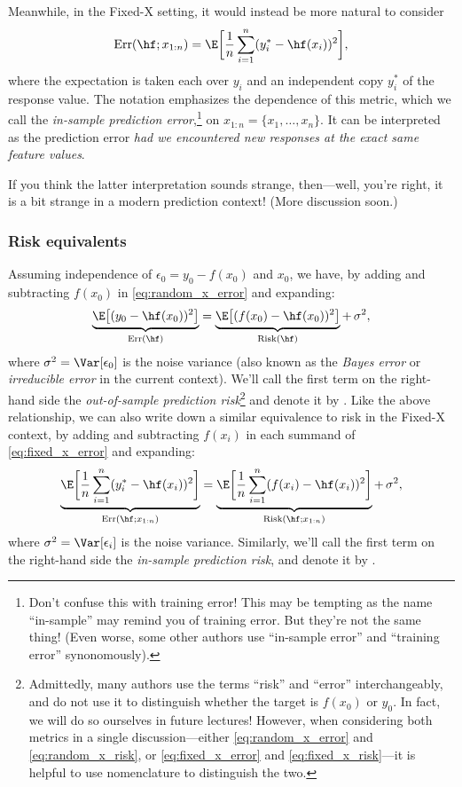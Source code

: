 \documentclass{article}
\begin{document}
Meanwhile, in the Fixed-X setting, it would instead be more natural to consider       
\begin{equation}
\label{eq:fixed_x_error}
\Err(\hf; x_{1:n}) = \E\bigg[ \frac{1}{n}\sum_{i=1}^n (y_i^* - \hf(x_i))^2
\bigg], 
\end{equation}
where the expectation is taken each over $y_i$ and an independent copy $y_i^*$
of the response value. The notation  emphasizes the 
dependence of this metric, which we call the \emph{in-sample prediction
  error},\footnote{Don't confuse this with training error! This may be tempting
  as the name ``in-sample'' may remind you of training error. But they're not
  the same thing! (Even worse, some other authors use ``in-sample error'' and
  ``training error'' synonomously).}     
on $x_{1:n} = \{x_1,\dots,x_n\}$. It can be interpreted as the prediction error
\emph{had we encountered new responses at the exact same feature values}.

If you think the latter interpretation sounds strange, then---well, you're
right, it is a bit strange in a modern prediction context! (More discussion
soon.)    

\subsubsection{Risk equivalents} 

Assuming independence of $\epsilon_0 = y_0 - f(x_0)$ and $x_0$, we have, by
adding and subtracting $f(x_0)$ in \eqref{eq:random_x_error} and expanding:  
\[
\underbrace{\E\big[ (y_0 - \hf(x_0))^2 \big]}_{\Err(\hf)} =
\underbrace{\E\big[ (f(x_0) - \hf(x_0))^2 \big]}_{\Risk(\hf)} +\, \sigma^2,
\]
where $\sigma^2 = \Var[\epsilon_0]$ is the noise variance (also known as the 
\emph{Bayes error} or \emph{irreducible error} in the current context). We'll
call the first term on the right-hand side the \emph{out-of-sample prediction
  risk}\footnote{Admittedly, many authors use the terms ``risk'' and ``error'' 
  interchangeably, and do not use it to distinguish whether the target is
  $f(x_0)$ or $y_0$. In fact, we will do so ourselves in future lectures!
  However, when considering both metrics in a single discussion---either 
  \eqref{eq:random_x_error} and \eqref{eq:random_x_risk}, or 
  \eqref{eq:fixed_x_error} and \eqref{eq:fixed_x_risk}---it is helpful to use  
  nomenclature to distinguish the two.} 
and denote it by \smash{$\Risk(\hf)$}. Like the above relationship, we can also
write down a similar equivalence to risk in the Fixed-X context, by adding and
subtracting $f(x_i)$ in each summand of \eqref{eq:fixed_x_error} and expanding:  
\[
\underbrace{\E\bigg[ \frac{1}{n}\sum_{i=1}^n (y_i^* - \hf(x_i))^2 
  \bigg]}_{\Err(\hf; x_{1:n})} =   
\underbrace{\E\bigg[ \frac{1}{n}\sum_{i=1}^n (f(x_i) - \hf(x_i))^2
  \bigg]}_{\Risk(\hf;  x_{1:n})} +\, \sigma^2, 
\]
where $\sigma^2 = \Var[\epsilon_i]$ is the noise variance. Similarly, we'll call
the first term on the right-hand side the \emph{in-sample prediction risk}, and
denote it by . 
\end{document}
